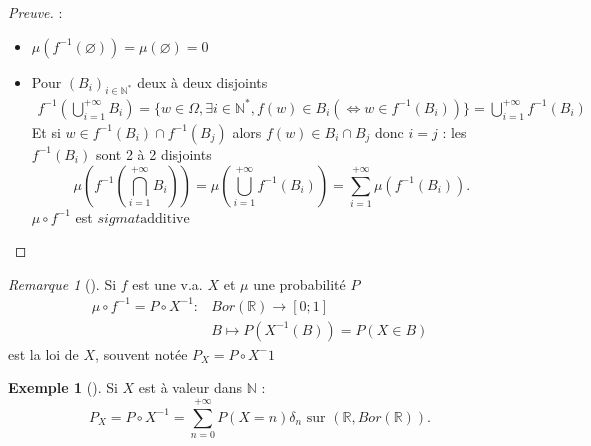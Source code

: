 \documentclass{article}
\theoremstyle{plain}%
\theoremstyle{definition}
\newtheorem{exmp}{Exemple}[section]
\theoremstyle{remark}
\newtheorem*{rem}{Remarque}
\begin{document}
    \begin{proof}[Preuve]
        :\\
        \begin{itemize}
            \item $\mu (f^{-1}(\varnothing )) = \mu (\varnothing ) = 0$ 
            \item Pour $ (B_i)_{i \in \mathbb{N}^*} $ deux à deux disjoints \begin{align*}
                f^{-1}(\bigcup_{i=1}^{+ \infty } B_i) = \{w \in \Omega, \exists i \in \mathbb{N}^*, f(w) \in B_i (\Leftrightarrow w \in f^{-1}(B_i))\} = \bigcup_{i=1}^{+\infty } f^{-1}(B_i)
            \end{align*} 
            Et si $ w \in f^{-1}(B_i) \cap f^{-1}(B_j) $ alors $ f(w) \in B_i \cap B_j $ donc $ i=j $ : les $ f^{-1}(B_i) $ sont 2 à 2 disjoints 
            \[
                \mu (f^{-1}(\bigcap_{i=1}^{+ \infty }B_i)) = \mu (\bigcup_{i=1}^{+\infty }f^{-1} (B_i)) = \sum_{i=1}^{+\infty }\mu (f^{-1} (B_i))
            .\]
            $ \mu \circ f^{-1} $ est $ sigmat \text{additive} $ 
        \end{itemize}
    \end{proof}
    \begin{rem}[]
        Si $ f $ est une v.a. $ X $ et $ \mu  $ une probabilité $ P $ \begin{align*}
            \mu \circ f^{-1} = P \circ X^{-1} :& Bor(\mathbb{R}) \to [0;1] \\
                                &B \mapsto P(X^{-1} (B)) = P(X \in B)
        \end{align*}
        est la loi de $ X $, souvent notée $ P_X = P \circ X^-1 $ 
    \end{rem}
    \begin{exmp}[]
        Si $ X  $ est à valeur dans $ \mathbb{N} $ : 
        \[
            P_X = P \circ X^{-1} = \sum_{n=0}^{+\infty } P(X=n) \delta _n \text{ sur } (\mathbb{R}, Bor(\mathbb{R}))
        .\]
    \end{exmp}
\end{document}
